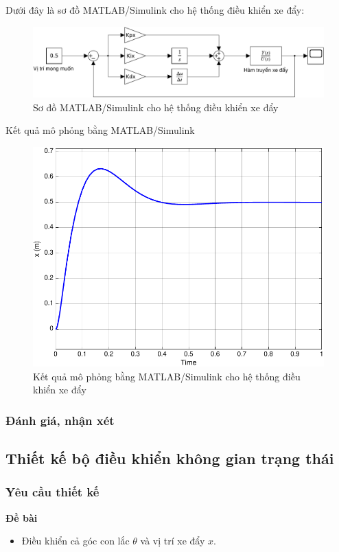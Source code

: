 \documentclass[12pt,a4paper]{article}
\begin{document}
Dưới đây là sơ đồ MATLAB/Simulink cho hệ thống điều khiển xe đẩy:
\begin{figure}[ht]
    \centering
    \includegraphics[width=\linewidth]{MATLAB_7.pdf}
    \caption{Sơ đồ MATLAB/Simulink cho hệ thống điều khiển xe đẩy}
\end{figure}

Kết quả mô phỏng bằng MATLAB/Simulink
\begin{figure}[ht]
    \centering
    \includegraphics[width=\linewidth]{MATLAB_6.pdf}
    \caption{Kết quả mô phỏng bằng MATLAB/Simulink cho hệ thống điều khiển xe đẩy}
\end{figure}
\subsubsection{Đánh giá, nhận xét}

\subsection{Thiết kế bộ điều khiển không gian trạng thái}
\subsubsection{Yêu cầu thiết kế}
\begin{minipage}[t]{0.3\linewidth}
    \textbf{Đề bài}
\end{minipage}\begin{minipage}[t]{0.6\linewidth}
    \begin{itemize}
        \item Điều khiển cả góc con lắc $\theta$ và vị trí xe đẩy $x$.
    \end{itemize}
\end{minipage}
\end{document}
